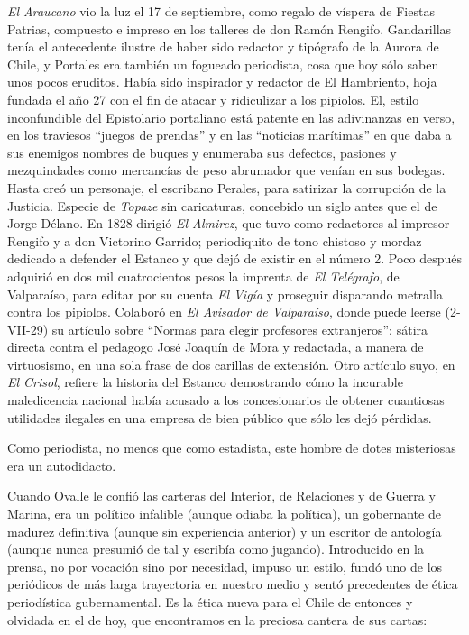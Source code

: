 \documentclass[10pt,twoside,openright]{memoir}
\begin{document}
\emph{El Araucano} vio la luz el 17 de septiembre, como
regalo de víspera de Fiestas
Patrias, compuesto e impreso en los talleres de don Ramón Rengifo.
Gandarillas tenía el antecedente ilustre de haber sido redactor y
tipógrafo de la Aurora de Chile, y Portales era también un fogueado
periodista, cosa que hoy sólo saben
unos pocos eruditos. Había sido inspirador y redactor de El Hambriento,
hoja fundada el año 27 con el fin de atacar y ridiculizar a los
pipiolos. El, estilo inconfundible
del Epistolario portaliano está patente en las adivinanzas en verso, en
los traviesos ``juegos de prendas'' y en las ``noticias marítimas'' en
que daba a sus enemigos nombres de buques y enumeraba sus defectos,
pasiones y mezquindades como mercancías de peso abrumador que venían en
sus bodegas. Hasta creó un personaje, el escribano Perales, para
satirizar la corrupción de la Justicia. Especie de \emph{Topaze} sin
caricaturas, concebido un siglo antes que el de Jorge Délano. En 1828
dirigió \emph{El Almirez}, que tuvo como redactores al impresor Rengifo y a don
Victorino Garrido; periodiquito de tono chistoso y mordaz dedicado a
defender el Estanco y que dejó de existir en el número 2. Poco después
adquirió en dos mil cuatrocientos pesos la imprenta de \emph{El Telégrafo}, de
Valparaíso, para editar por su cuenta \emph{El Vigía} y proseguir disparando
metralla contra los pipiolos. Colaboró en \emph{El Avisador de Valparaíso},
donde puede leerse (2-VII-29) su artículo sobre ``Normas para elegir
profesores extranjeros'': sátira directa contra el pedagogo José Joaquín
de Mora y redactada, a manera de virtuosismo, en una sola frase de dos
carillas de extensión. Otro artículo suyo, en \emph{El Crisol}, refiere la
historia del Estanco demostrando cómo la incurable maledicencia nacional
había acusado a los concesionarios de obtener cuantiosas utilidades
ilegales en una empresa de bien público que sólo les dejó pérdidas.

Como periodista, no menos que como estadista, este hombre de dotes
misteriosas era un autodidacto.

Cuando Ovalle le confió las carteras del Interior, de Relaciones y de
Guerra y Marina, era un político infalible (aunque odiaba la política),
un gobernante de madurez definitiva (aunque sin experiencia anterior) y
un escritor de antología (aunque nunca presumió de tal y escribía como
jugando). Introducido en la prensa, no por vocación sino por necesidad,
impuso un estilo, fundó uno de los periódicos de más larga trayectoria
en nuestro medio y sentó precedentes de
ética periodística gubernamental. Es
la ética nueva para el Chile de entonces y olvidada en el de hoy, que
encontramos en la preciosa cantera de sus
cartas:
\end{document}
